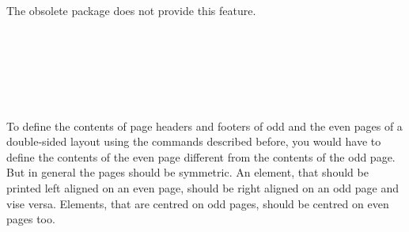The obsolete package  does not
provide this feature.%
%
%
%
%
%
%
%


\begin{Declaration}
                \\
                \\
                \\
                \\
                \\
\end{Declaration}
%
%
%
%
%
%
To define the contents of page headers and footers of odd and the even pages
of a double-sided layout using the commands described before, you would have to
define the contents of the even page different from the contents of the odd
page. But in general the pages should be symmetric. An element, that should be
printed left aligned on an even page, should be right aligned on an odd page
and vise versa. Elements, that are centred on odd pages, should be centred on
even pages too.

